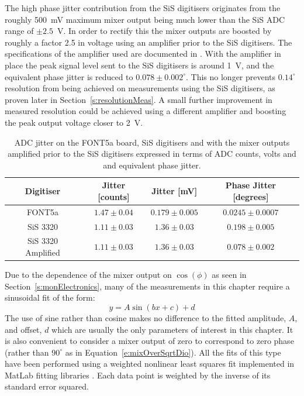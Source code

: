 The high phase jitter contribution from the SiS digitisers originates from the roughly 500~mV maximum mixer output being much lower than the SiS ADC range of \(\pm2.5\)~V. In order to rectify this the mixer outputs are boosted by roughly a factor 2.5 in voltage using an amplifier prior to the SiS digitisers. The specifications of the amplifier used are documented in \cite{ampSiS}. With the amplifier in place the peak signal level sent to the SiS digitisers is around 1~V, and the equivalent phase jitter is reduced to \(0.078\pm0.002^\circ\). This no longer prevents \(0.14^\circ\) resolution from being achieved on measurements using the SiS digitisers, as proven later in Section~\ref{s:resolutionMeas}. A small further improvement in measured resolution could be achieved using a different amplifier and boosting the peak output voltage closer to 2~V.

\begin{table}
  \begin{center}
    \begin{tabular}{|c c c c|}
	   \hline
       Digitiser & Jitter [counts] & Jitter [mV] & Phase Jitter [degrees] \\ \hline
       FONT5a & \(1.47\pm0.04\) & \(0.179\pm0.005\) & \(0.0245\pm0.0007\)\\ 
       SiS 3320 & \(1.11\pm0.03\) & \(1.36\pm0.03\) & \(0.198\pm0.005\)\\
       SiS 3320 Amplified & \(1.11\pm0.03\) & \(1.36\pm0.03\) & \(0.078\pm0.002\)\\ \hline
    \end{tabular}
    \caption{ADC jitter on the FONT5a board, SiS digitisers and with the mixer outputs amplified prior to the SiS digitisers expressed in terms of ADC counts, volts and and equivalent phase jitter.}
  	\label{t:adcNoise}
  \end{center}
\end{table}




Due to the dependence of the mixer output on \(\cos(\phi)\) as seen in Section~\ref{s:monElectronics}, many of the measurements in this chapter require a sinusoidal fit of the form:
\begin{equation}
y = A\sin(bx + c) + d
\label{e:generalSinEq}
\end{equation}
The use of sine rather than cosine makes no difference to the fitted amplitude, \(A\), and offset, \(d\) which are usually the only parameters of interest in this chapter. It is also convenient to consider a mixer output of zero to correspond to zero phase (rather than \(90^\circ\) as in Equation~\ref{e:mixOverSqrtDio}). All the fits of this type have been performed using a weighted nonlinear least squares fit implemented in MatLab fitting libraries \cite{MatLabFit}. Each data point is weighted by the inverse of its standard error squared.

